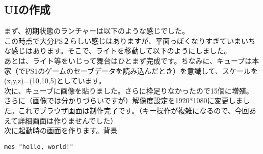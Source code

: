 \documentclass[b5paper,11pt]{jsarticle}
\begin{document}
\begin{multicols*}{3}
\section{UIの作成}
まず、初期状態のランチャーは以下のような感じでした。\\
この時点で大分PS２らしい感じはありますが、平面っぽくなりすぎていまいちな感じはあります。そこで、ライトを移動して以下のようにしました。\\
あとは、ライト等をいじって舞台はひとまず完成です。ちなみに、キューブは本家（でPS1のゲームのセーブデータを読み込んだとき）を意識して、スケールを(x,y,z)=(10,10,5)としています。\\
次に、キューブに画像を貼りました。さらに枠足りなかったので15個に増殖。\\
さらに（画像では分かりづらいですが）解像度設定を1920*1080に変更しました。これでブラウザ画面は制作完了です。（キー操作が複雑になるので、今回あえて詳細画面は作りませんでした）\\
次に起動時の画面を作ります。背景
\begin{lstlisting}[caption=Sample]
mes "hello, world!"
\end{lstlisting}

\end{multicols*}
\end{document}
